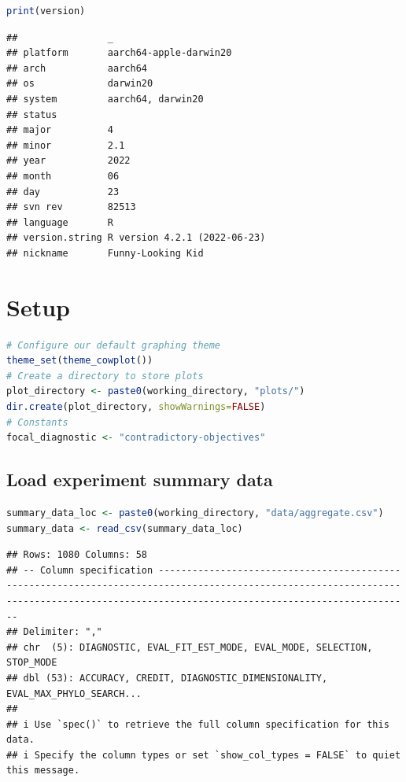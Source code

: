 \documentclass[
]{book}
\begin{document}
\begin{lstlisting}[language=R]
print(version)
\end{lstlisting}

\begin{lstlisting}
##                _                           
## platform       aarch64-apple-darwin20      
## arch           aarch64                     
## os             darwin20                    
## system         aarch64, darwin20           
## status                                     
## major          4                           
## minor          2.1                         
## year           2022                        
## month          06                          
## day            23                          
## svn rev        82513                       
## language       R                           
## version.string R version 4.2.1 (2022-06-23)
## nickname       Funny-Looking Kid
\end{lstlisting}

\hypertarget{setup-1}{%
\section{Setup}\label{setup-1}}

\begin{lstlisting}[language=R]
# Configure our default graphing theme
theme_set(theme_cowplot())
# Create a directory to store plots
plot_directory <- paste0(working_directory, "plots/")
dir.create(plot_directory, showWarnings=FALSE)
# Constants
focal_diagnostic <- "contradictory-objectives"
\end{lstlisting}

\hypertarget{load-experiment-summary-data-1}{%
\subsection{Load experiment summary data}\label{load-experiment-summary-data-1}}

\begin{lstlisting}[language=R]
summary_data_loc <- paste0(working_directory, "data/aggregate.csv")
summary_data <- read_csv(summary_data_loc)
\end{lstlisting}

\begin{lstlisting}
## Rows: 1080 Columns: 58
## -- Column specification -----------------------------------------------------------------------------------------------------------------------------------------------------------------------------------------
## Delimiter: ","
## chr  (5): DIAGNOSTIC, EVAL_FIT_EST_MODE, EVAL_MODE, SELECTION, STOP_MODE
## dbl (53): ACCURACY, CREDIT, DIAGNOSTIC_DIMENSIONALITY, EVAL_MAX_PHYLO_SEARCH...
## 
## i Use `spec()` to retrieve the full column specification for this data.
## i Specify the column types or set `show_col_types = FALSE` to quiet this message.
\end{lstlisting}
\end{document}
